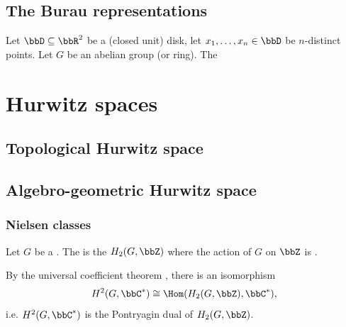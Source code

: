 



\subsection{The Burau representations}






\begin{definition}
    Let $\bbD \subseteq \bbR^2$ be a (closed unit) disk, let $x_1,\ldots,x_n \in \bbD$ be $n$-distinct points. Let $G$ be an abelian group (or ring). 
    The 
\end{definition}









\section{Hurwitz spaces}


\subsection{Topological Hurwitz space}


\subsection{Algebro-geometric Hurwitz space}


\subsubsection{Nielsen classes}

\begin{definition} \label{definition:schur_multiplier_of_a_group}
    Let $G$ be a . 
    The  is the  $H_2(G, \bbZ)$ where the action of $G$ on $\bbZ$ is .

    By the universal coefficient theorem , there is an isomorphism    
    $$H^2(G,\bbC^*) \cong \Hom(H_2(G,\bbZ), \bbC^*),$$
    i.e. $H^2(G,\bbC^*)$ is the Pontryagin dual of $H_2(G,\bbZ)$.
\end{definition}


